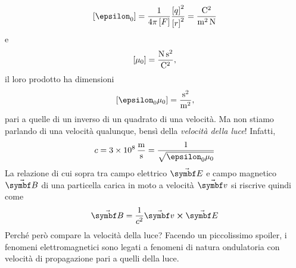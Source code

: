 \begin{equation*}
	\left[\epsilon_0\right]=\frac{1}{4\pi\left[F\right]}\frac{\left[q\right]^2}{\left[r\right]^2}=\unit[per-mode = fraction]{\coulomb\squared\per\meter\squared\per\newton}
\end{equation*}
e
\begin{equation*}
	\left[\mu_0\right]=\unit[per-mode = fraction]{\newton\second\squared\per\coulomb\squared},
\end{equation*}
il loro prodotto ha dimensioni
\begin{equation*}
	\left[\epsilon_0\mu_0\right]=\unit[per-mode = fraction]{\second\squared\per\meter\squared},
\end{equation*}
pari a quelle di un inverso di un quadrato di una velocità. Ma non stiamo parlando di una velocità qualunque, bensì della \textit{velocità della luce}! Infatti,
\begin{equation*}
	c=\SI[per-mode = fraction]{3d8}{\meter\per\second}=\frac{1}{\sqrt{\epsilon_0\mu_0}}
\end{equation*}
La relazione di cui sopra tra campo elettrico $\vba{E}$ e campo magnetico $\vba{B}$ di una particella carica in moto a velocità $\vba{v}$ si riscrive quindi come
\begin{equation}
	\vba{B}=\frac{1}{c^2}\vba{v}\cross\vba{E}
\end{equation}
Perché però compare la velocità della luce? Facendo un piccolissimo spoiler, i fenomeni elettromagnetici sono legati a fenomeni di natura ondulatoria con velocità di propagazione pari a quelli della luce.
